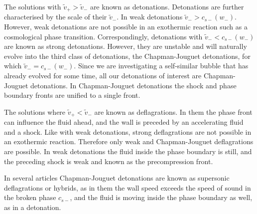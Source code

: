 The solutions with $\tilde{v}_+ > \tilde{v}_-$ are known as detonations.
Detonations are further characterised by the scale of their $\tilde{v}_-$.
In weak detonations $\tilde{v}_- > c_{s-}(w_-)$.
However, weak detonations are not possible in an exothermic reaction such as a cosmological phase transition.
\cite[p. 265]{rezzolla_relativistic_2013}
Correspondingly, detonations with $\tilde{v}_- < c_{s-}(w_-)$ are known as strong detonations.
However, they are unstable and will naturally evolve into the third class of detonations,
the Chapman-Jouguet detonations, for which $\tilde{v}_- = c_{s-}(w_-)$.
\cite[p. 279]{rezzolla_relativistic_2013}
Since we are investigating a self-similar bubble that has already evolved for some time,
all our detonations of interest are Chapman-Jouguet detonations.
In Chapman-Jouguet detonations the shock and phase boundary fronts are unified to a single front.

The solutions where $\tilde{v}_+ < \tilde{v}_-$ are known as deflagrations.
In them the phase front can influence the fluid ahead, and the wall is preceded by an accelerating fluid and a shock.
Like with weak detonations, strong deflagrations are not possible in an exothermic reaction.
\cite[p. 267]{rezzolla_relativistic_2013}
Therefore only weak and Chapman-Jouguet deflagrations are possible.
In weak detonations the fluid inside the phase boundary is still, and the preceding shock is weak and
known as the precompression front.

In several articles \cites[p. 37]{lecture_notes}[p. 35]{hindmarsh_gw_pt_2019}
Chapman-Jouguet detonations are known as supersonic deflagrations or hybrids,
as in them the wall speed exceeds the speed of sound in the broken phase $c_{s-}$,
and the fluid is moving inside the phase boundary as well, as in a detonation.

